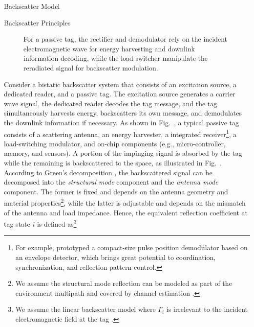 \documentclass[journal]{IEEEtran}
\begin{document}
\begin{section}{Backscatter Model}
\begin{subsection}{Backscatter Principles}
\begin{figure}[!t]
{					\label{fi:block_diagram}
				}
				\caption{For a passive tag, the rectifier and demodulator rely on the incident electromagnetic wave for energy harvesting and downlink information decoding, while the load-switcher manipulate the reradiated signal for backscatter modulation.}
				\label{fi:tag}
			\end{figure}
			Consider a bistatic backscatter system that consists of an excitation source, a dedicated reader, and a passive tag. The excitation source generates a carrier wave signal, the dedicated reader decodes the tag message, and the tag simultaneously harvests energy, backscatters its own message, and demodulates the downlink information if necessary. As shown in Fig.~, a typical passive tag consists of a scattering antenna, an energy harvester, a integrated receiver\footnote{For example, \cite{Kim2021a} prototyped a compact-size pulse position demodulator based on an envelope detector, which brings great potential to coordination, synchronization, and reflection pattern control.}, a load-switching modulator, and on-chip components (e.g., micro-controller, memory, and sensors). A portion of the impinging signal is absorbed by the tag while the remaining is backscattered to the space, as illustrated in Fig.~. According to Green's decomposition \cite{Hansen1989}, the backscattered signal can be decomposed into the \emph{structural mode} component and the \emph{antenna mode} component. The former is fixed and depends on the antenna geometry and material properties\footnote{We assume the structural mode reflection can be modeled as part of the environment multipath and covered by channel estimation \cite{Boyer2014}.}, while the latter is adjustable and depends on the mismatch of the antenna and load impedance. Hence, the equivalent reflection coefficient at tag state $i$ is defined as\footnote{We assume the linear backscatter model where $\Gamma_i$ is irrelevant to the incident electromagnetic field at the tag \cite{Dobkin2012}.}

\end{subsection}
\end{section}
\end{document}

